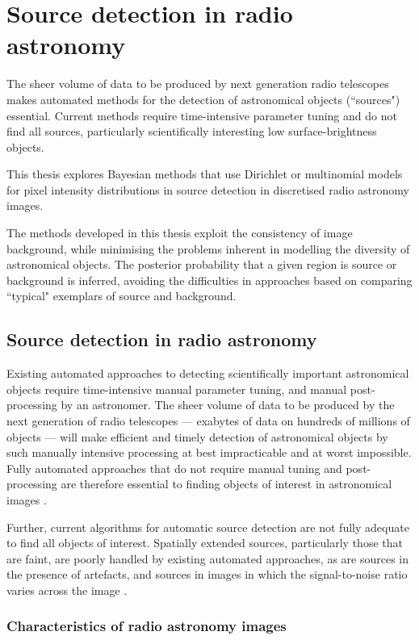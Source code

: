 \chapter{Source detection in radio astronomy}\label{C:intro}
The sheer volume of data to be produced by next generation radio telescopes makes automated methods for the detection of astronomical objects (``sources") essential. Current methods require time-intensive parameter tuning and do not find all sources, particularly scientifically interesting low surface-brightness objects.

This thesis explores Bayesian methods that use Dirichlet or multinomial models for pixel intensity distributions in source detection in discretised radio astronomy images.

The methods developed in this thesis exploit the consistency of image background, while minimising the problems inherent in modelling the diversity of astronomical objects. The posterior probability that a given region is source or background is inferred, avoiding the difficulties in approaches based on comparing ``typical" exemplars of source and background.

\section{Source detection in radio astronomy}
Existing automated approaches to detecting scientifically important astronomical objects require time-intensive manual parameter tuning, and manual post-processing by an astronomer. The sheer volume of data to be produced by the next generation of radio telescopes --- exabytes of data on hundreds of millions of objects --- will make efficient and timely detection of astronomical objects by such manually intensive processing at best impracticable and at worst impossible. Fully automated approaches that do not require manual tuning and post-processing are therefore essential to finding objects of interest in astronomical images \cite{norris2011emu}.

Further, current algorithms for automatic source detection are not fully adequate to find all objects of interest. Spatially extended sources, particularly those that are faint, are poorly handled by existing automated approaches, as are sources in the presence of artefacts, and sources in images in which the signal-to-noise ratio varies across the image \cite{hollitt2012feature, norris2011emu, norris2012radio}.

\subsection{Characteristics of radio astronomy images}

